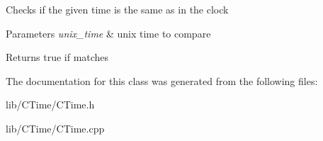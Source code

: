 Checks if the given time is the same as in the clock 
\begin{DoxyParams}{Parameters}
{\em unix\+\_\+time} & unix time to compare \\
\hline
\end{DoxyParams}
\begin{DoxyReturn}{Returns}
true if matches 
\end{DoxyReturn}


The documentation for this class was generated from the following files\+:\begin{DoxyCompactItemize}
\item 
lib/\+C\+Time/C\+Time.\+h\item 
lib/\+C\+Time/C\+Time.\+cpp\end{DoxyCompactItemize}
